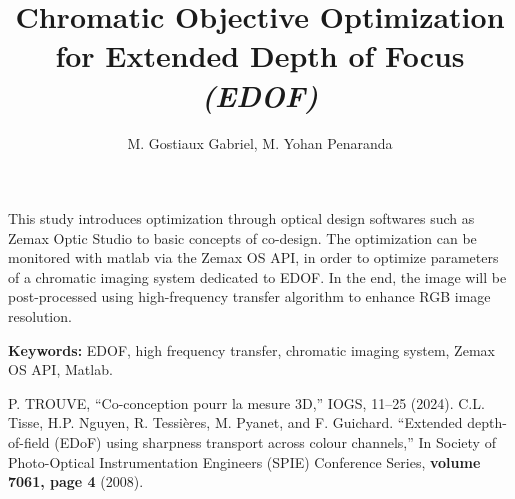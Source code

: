 \documentclass[10pt,letterpaper]{article}
\begin{document}
\title{Chromatic Objective Optimization for Extended Depth of Focus \textit{(EDOF)}}

\author{M. Gostiaux Gabriel, M. Yohan Penaranda}

\address{M. Gabriel Gostiaux, Master of Science student, Institute of Optics, \\ Palaiseau, 91 120, France}


\address{M. Yohan Penaranda, Master of Science student, Institute of Optics, \\ Palaiseau, 91 120, France}




\begin{abstract*}
This study introduces optimization through optical design softwares such as Zemax Optic Studio to basic concepts of co-design. The optimization can be monitored with matlab via the Zemax OS API, in order to optimize parameters of a chromatic imaging system dedicated to EDOF. In the end, the image will be post-processed using high-frequency transfer algorithm to enhance RGB image resolution.
\hfill \break

\textbf{Keywords:} EDOF, high frequency transfer, chromatic imaging system, Zemax OS API, Matlab.


\end{abstract*}


\begin{thebibliography}{99}

 P. TROUVE, ``Co-conception pourr la mesure 3D,'' IOGS, 11--25 (2024).
 C.L. Tisse, H.P. Nguyen, R. Tessières, M. Pyanet, and F. Guichard. ``Extended
depth-of-field (EDoF) using sharpness transport across colour channels,'' In
Society of Photo-Optical Instrumentation Engineers (SPIE) Conference Series, {\bf volume 7061, page 4} (2008).

\end{thebibliography}
\end{document}

